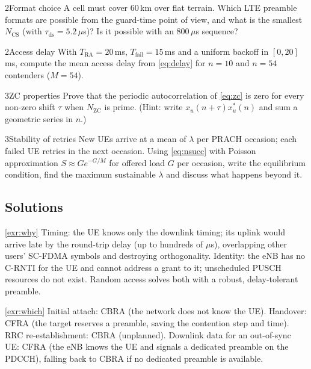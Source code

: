 \documentclass[11pt,a4paper]{article}
\begin{document}
\begin{exercisebox}{2}{Format choice}\label{exr:format}
A cell must cover 60\,km over flat terrain. Which LTE preamble formats are possible from the guard-time
point of view, and what is the smallest $N_{\mathrm{CS}}$ (with $\tau_{\mathrm{ds}} = 5.2\,\mu$s)? Is it
possible with an 800\,$\mu$s sequence?
\end{exercisebox}

\begin{exercisebox}{2}{Access delay}\label{exr:delay}
With $T_{\mathrm{RA}} = 20$\,ms, $T_{\mathrm{fail}} = 15$\,ms and a uniform backoff in $[0,20]$\,ms, compute the
mean access delay from \cref{eq:delay} for $n = 10$ and $n = 54$ contenders ($M = 54$).
\end{exercisebox}

\begin{exercisebox}{3}{ZC properties}\label{exr:zc}
Prove that the periodic autocorrelation of \cref{eq:zc} is zero for every non-zero shift $\tau$ when
$N_{\mathrm{ZC}}$ is prime. (Hint: write $x_u(n+\tau)x_u^\ast(n)$ and sum a geometric series in $n$.)
\end{exercisebox}

\begin{exercisebox}{3}{Stability of retries}\label{exr:stab}
New UEs arrive at a mean of $\lambda$ per PRACH occasion; each failed UE retries in the next occasion.
Using \cref{eq:nsucc} with Poisson approximation $S \approx G e^{-G/M}$ for offered load $G$ per occasion,
write the equilibrium condition, find the maximum sustainable $\lambda$ and discuss what happens beyond it.
\end{exercisebox}

\subsection*{Solutions}

\begin{solutionbox}{\ref{exr:why}}
Timing: the UE knows only the downlink timing; its uplink would arrive late by the round-trip delay (up to
hundreds of $\mu$s), overlapping other users' SC-FDMA symbols and destroying orthogonality. Identity: the
eNB has no C-RNTI for the UE and cannot address a grant to it; unscheduled PUSCH resources do not exist.
Random access solves both with a robust, delay-tolerant preamble.
\end{solutionbox}

\begin{solutionbox}{\ref{exr:which}}
Initial attach: CBRA (the network does not know the UE). Handover: CFRA (the target reserves a preamble,
saving the contention step and time). RRC re-establishment: CBRA (unplanned). Downlink data for an
out-of-sync UE: CFRA (the eNB knows the UE and signals a dedicated preamble on the PDCCH), falling back to
CBRA if no dedicated preamble is available.
\end{solutionbox}
\end{document}
